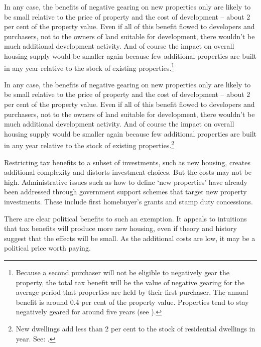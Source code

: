 \documentclass{grattanAlpha}\usepackage[]{graphicx}\usepackage[]{color}
\newcommand{\stopifendnote}[1]{}
\begin{document}
In any case, the benefits of negative gearing on new properties only are likely to be small relative to the price of property and the cost of development – about 2 per cent of the property value.  Even if all of this benefit flowed to developers and purchasers, not to the owners of land suitable for development, there wouldn’t be much additional development activity. And of course the impact on overall housing supply would be smaller again because few additional properties are built in any year relative to the stock of existing properties.\footnote{Because a second purchaser will not be eligible to negatively gear the property, the total tax benefit will be the value of negative gearing for the average period that properties are held by their first purchaser. The annual benefit is around 0.4 per cent of the property value. Properties tend to stay negatively geared for around five years (see \stopifendnote{}).} 

In any case, the benefits of negative gearing on new properties only are likely to be small relative to the price of property and the cost of development – about 2 per cent of the property value.  Even if all of this benefit flowed to developers and purchasers, not to the owners of land suitable for development, there wouldn’t be much additional development activity. And of course the impact on overall housing supply would be smaller again because few additional properties are built in any year relative to the stock of existing properties.\footnote{New dwellings add less than 2 per cent to the stock of residential dwellings in year. See: \textcite[][47]{ACILConsulting2015AnalysisofNG}.} 

Restricting tax benefits to a subset of investments, such as new housing, creates additional complexity and distorts investment choices. But the costs may not be high. Administrative issues such as how to define ‘new properties’ have already been addressed through government support schemes that target new property investments. These include first homebuyer’s grants and stamp duty concessions. 

There are clear political benefits to such an exemption.  It appeals to intuitions that tax benefits will produce more new housing, even if theory and history suggest that the effects will be small.  As the additional costs are low, it may be a political price worth paying.
\end{document}
